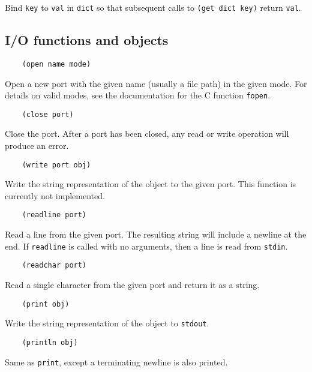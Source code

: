 \documentclass{article}
\newcommand{\inlinecode}{\texttt}
\begin{document}
Bind \inlinecode{key} to \inlinecode{val} in \inlinecode{dict} so that subsequent calls to \inlinecode{(get dict key)} return \inlinecode{val}.

\subsection{I/O functions and objects}
\begin{verbatim}
    (open name mode)
\end{verbatim}

Open a new port with the given name (usually a file path) in the given mode. For details on valid modes, see the documentation for the C function \inlinecode{fopen}.

\begin{verbatim}
    (close port)
\end{verbatim}

Close the port. After a port has been closed, any read or write operation will produce an error.

\begin{verbatim}
    (write port obj)
\end{verbatim}

Write the string representation of the object to the given port. This function is currently not implemented.

\begin{verbatim}
    (readline port)
\end{verbatim}

Read a line from the given port. The resulting string will include a newline at the end. If \inlinecode{readline} is called with no arguments, then a line is read from \inlinecode{stdin}.

\begin{verbatim}
    (readchar port)
\end{verbatim}

Read a single character from the given port and return it as a string.

\begin{verbatim}
    (print obj)
\end{verbatim}

Write the string representation of the object to \inlinecode{stdout}.

\begin{verbatim}
    (println obj)
\end{verbatim}

Same as \inlinecode{print}, except a terminating newline is also printed.
\end{document}
